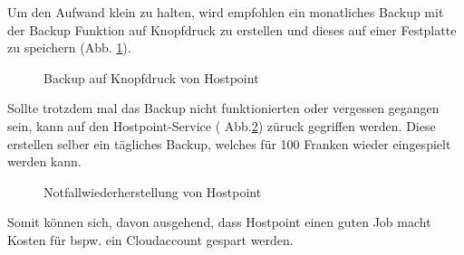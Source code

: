 Um den Aufwand klein zu halten, wird empfohlen ein monatliches Backup mit der Backup Funktion auf Knopfdruck zu erstellen und dieses auf einer Festplatte zu speichern (Abb. \ref{img:Backup_Funktion}).
\begin{figure}[h!]
	\centering
	\caption{Backup auf Knopfdruck von Hostpoint}
	\label{img:Backup_Funktion}
\end{figure}
Sollte trotzdem mal das Backup nicht funktionierten oder vergessen gegangen sein, kann auf den Hostpoint-Service ( Abb.\ref{img:Notfallwiederherstellung}) züruck gegriffen werden. Diese erstellen selber ein tägliches Backup, welches für 100 Franken wieder eingespielt werden kann.
\begin{figure}[h!]
	\centering
	\caption{Notfallwiederherstellung von Hostpoint}
	\label{img:Notfallwiederherstellung}
\end{figure}
Somit können sich, davon ausgehend, dass Hostpoint einen guten Job macht Kosten für bspw. ein Cloudaccount gespart werden.

